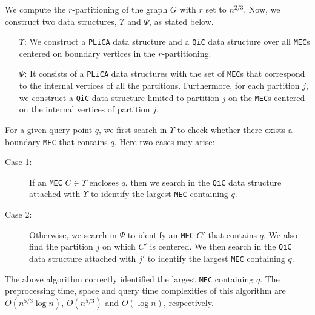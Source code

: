 \documentclass[12pt]{llncs}
\begin{document}
We compute the $r$-partitioning of the graph $G$ with $r$ set to $n^{2/3}$. Now, we construct two data structures, $\Upsilon$ and $\Psi$, as stated 
below.
\begin{itemize}
\item[$\Upsilon$:] We 
construct a {\tt PLiCA} data structure and a {\tt QiC} data structure  over all {\tt MEC}s centered on boundary vertices in the $r$-partitioning. 
\item[$\Psi$:] It consists of a {\tt PLiCA} data structures with the set of {\tt MEC}s 
that correspond to the internal vertices of all the partitions.
Furthermore, for each partition $j$, we construct a {\tt QiC} data structure limited to partition $j$ on the {\tt MEC}s centered on the internal vertices of partition $j$.
\end{itemize}
For a given query point $q$, we first search in $\Upsilon$ to check whether there exists 
a boundary {\tt MEC} that contains $q$. Here two cases may arise:
\begin{description}
\item[Case 1:]  If an {\tt MEC} $C \in \Upsilon$ encloses $q$, then we search in the {\tt QiC} 
data structure attached with $\Upsilon$ to identify the largest {\tt MEC} containing $q$.
\item[Case 2:] Otherwise, we search in $\Psi$ to identify an {\tt MEC} $C'$ that 
contains $q$. We also find the partition $j$ on which $C'$ is centered. We  then search in the {\tt QiC} data structure attached with $j'$ to 
identify the largest {\tt MEC} containing $q$.
\end{description}
\begin{lemma} 
The above algorithm correctly identified the largest {\tt MEC} containing $q$. The 
preprocessing time, space and query time complexities of this algorithm are 
$O(n^{5/3} 
\log n)$, $O(n^{5/3})$ and $O(\log n)$, respectively. 
\end{lemma}
\end{document}
